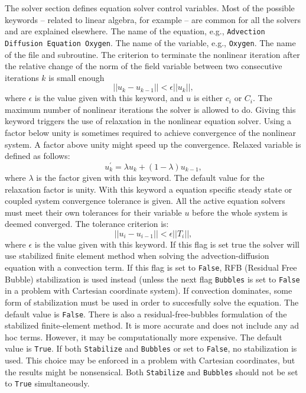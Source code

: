 The solver section defines equation solver control variables. Most of the possible
keywords -- related to linear algebra, for example -- are common for all the solvers and are 
explained elsewhere.
\sifbegin
{}
The name of the equation, e.g., {\tt Advection Diffusion Equation Oxygen}.
The name of the variable, e.g., {\tt Oxygen}.
The name of the file and subroutine.
The criterion to
terminate the nonlinear iteration after the relative change of the norm of the field variable
between two consecutive iterations $k$ is small enough
$$
 ||u_k-u_{k-1}|| < \epsilon ||u_k||,
$$
where $\epsilon$ is the value given with this keyword, and $u$ is either $c_i$
or $C_i$.
The maximum number of nonlinear iterations the solver is allowed to do.
Giving this keyword triggers the use
of  relaxation in the nonlinear equation solver.
Using a factor below unity is sometimes required to achieve convergence of the nonlinear system.
A factor above unity might speed up the convergence. Relaxed variable is defined as follows:
$$
 u^{'}_k = \lambda u_k + (1-\lambda) u_{k-1},
$$
where $\lambda$ is the factor given with this keyword. The default value for the relaxation factor
is unity.
With this keyword a equation specific steady state or coupled system
convergence tolerance is given.
All the active equation solvers must meet their own tolerances for their
variable $u$ before the 
whole system is deemed converged.
The tolerance criterion is:
$$
 ||u_i-u_{i-1}|| < \epsilon ||T_i||,
$$
where $\epsilon$ is the value given with this keyword.
If this flag is set true the solver will use stabilized finite element method
when solving the advection-diffusion equation with a convection term.
If this flag is set to
{\tt False}, RFB (Residual Free Bubble) stabilization is used instead (unless
the next flag {\tt Bubbles} is set to {\tt False} in a problem with Cartesian
coordinate system).
If convection dominates, some form of stabilization must be used in order to succesfully solve the equation.
The default value is {\tt False}.
There is also a residual-free-bubbles formulation of the stabilized finite-element
method. It is more accurate and does not include any ad hoc terms. However, it may
be computationally more expensive. The default value is {\tt True}.
If both {\tt Stabilize} and {\tt Bubbles} or set to {\tt False}, no stabilization
is used. This choice may be enforced in a problem with Cartesian coordinates,
but the results might be nonsensical. Both
{\tt Stabilize} and {\tt Bubbles} should not be set to {\tt True}
simultaneously.
\sifend

